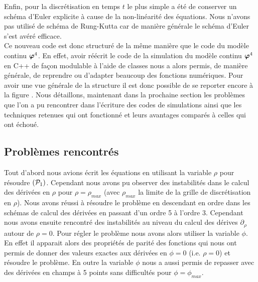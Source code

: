 \documentclass[10.5pt]{article}
\begin{document}
\begin{multicols}{2}
Enfin, pour la discrétisation en temps $t$ le plus simple a été de conserver un schéma d'Euler explicite à cause de la non-linéarité des équations. Nous n'avons pas utilisé de schéma de Rung-Kutta car de manière générale le schéma d'Euler s'est avéré efficace.\\

Ce nouveau code est donc structuré de la même manière que le code du modèle continu $\boldsymbol{ \varphi}^4$. En effet, avoir réécrit le code de la simulation du modèle continu $\boldsymbol{ \varphi}^4$ en C++ de façon modulable à l'aide de classes nous a alors permis, de manière générale, de reprendre ou d'adapter beaucoup des fonctions numériques. Pour avoir une vue générale de la structure il est donc possible de se reporter encore à la figure . Nous détaillons, maintenant dans la prochaine section les problèmes que l'on a pu rencontrer dans l'écriture des codes de simulations ainsi que les techniques retenues qui ont fonctionné et leurs avantages comparés à celles qui ont échoué. 





\subsection{Problèmes rencontrés}

\label{sec:Problemes}

Tout d'abord nous avions écrit les équations en utilisant la variable $\rho$ pour résoudre $(\mathcal{P}_1)$. Cependant nous avons pu observer des instabilités dans le calcul des dérivées en $\rho$ pour $\rho = \rho_{max}$ (avec $\rho_{max}$ la limite de la grille de discrétisation en $\rho$). Nous avons réussi à résoudre le problème en descendant en ordre dans les schémas de calcul des dérivées en passant d'un ordre 5 à l'ordre 3. Cependant nous avons ensuite rencontré des instabilités au niveau du calcul des dérives $\partial_{\rho}$ autour de $\rho = 0$. Pour régler le problème nous avons alors utiliser la variable $\phi$. En effet il apparait alors des propriétés de parité des fonctions qui nous ont permis de donner des valeurs exactes aux dérivées en $\phi = 0$ (i.e. $\rho = 0$) et résoudre le problème. En outre la variable $\phi$ nous a aussi permis de repasser avec des dérivées en champs à 5 points sans difficultés pour $\phi = \phi_{max}$. \\


\end{multicols}
\end{document}
